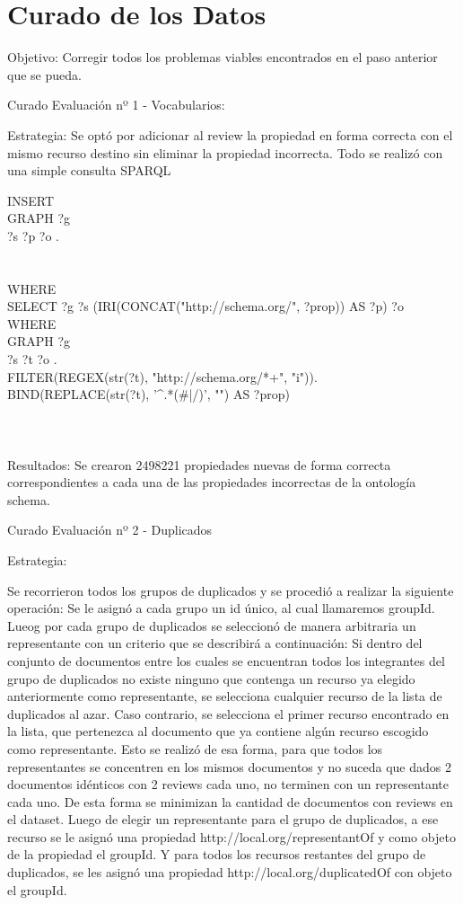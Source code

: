 \chapter{Curado de los Datos}
\label{chapter:curado}

Objetivo:
Corregir todos los problemas viables encontrados en el paso anterior que se pueda.

Curado Evaluación nº 1 - Vocabularios:

Estrategia:
Se optó por adicionar al review la propiedad en forma correcta con el mismo recurso destino sin eliminar la propiedad incorrecta. 
Todo se realizó con una simple consulta SPARQL

INSERT{\\
  GRAPH ?g {\\
    ?s ?p ?o .\\
  }\\
}\\
WHERE{\\
  SELECT ?g ?s (IRI(CONCAT("http://schema.org/", ?prop)) AS ?p) ?o\\
  WHERE{\\
    GRAPH ?g{\\
      ?s ?t ?o .\\
      FILTER(REGEX(str(?t), "http://schema.org/*+", "i")).\\
      BIND(REPLACE(str(?t), '^.*(#|/)', "") AS ?prop)\\
    }\\
  }\\
}\\

Resultados:
Se crearon 2498221 propiedades nuevas de forma correcta correspondientes a cada una de las propiedades incorrectas de la ontología 
schema.

Curado Evaluación nº 2 - Duplicados

Estrategia: 

Se recorrieron todos los grupos de duplicados y se procedió a realizar la siguiente operación:
Se le asignó a cada grupo un id único, al cual llamaremos groupId.
Lueog por cada grupo de duplicados se seleccionó de manera arbitraria un representante con un criterio que se describirá a continuación:
Si dentro del conjunto de documentos entre los cuales se encuentran todos los integrantes del grupo de duplicados no existe ninguno 
que contenga un recurso ya elegido anteriormente como representante, se selecciona cualquier recurso de la lista de duplicados al azar.
Caso contrario, se selecciona el primer recurso encontrado en la lista, que pertenezca al documento que ya contiene algún recurso escogido 
como representante.
Esto se realizó de esa forma, para que todos los representantes se concentren en los mismos documentos y no suceda que dados 2 
documentos idénticos con 2 reviews cada uno, no terminen con un representante cada uno. De esta forma se minimizan la cantidad de 
documentos con reviews en el dataset.
Luego de elegir un representante para el grupo de duplicados, a ese recurso se le asignó una propiedad http://local.org/representantOf y 
como objeto de la propiedad el groupId.
Y para todos los recursos restantes del grupo de duplicados, se les asignó una propiedad http://local.org/duplicatedOf con objeto 
el groupId.

